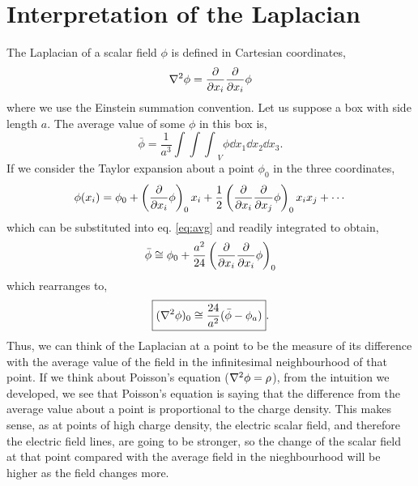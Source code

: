 \documentclass{book}
\begin{document}
\chapter{Interpretation of the Laplacian}
The Laplacian of a scalar field $\phi$ is defined in Cartesian coordinates,
\begin{equation}
	\laplacian{\phi} = \pdv{x_i}\pdv{x_i} \phi
\end{equation}
where we use the Einstein summation convention. Let us suppose a box with side length $a$. The average value of some $\phi$ in this box is,
\begin{equation}
	\bar{\phi} = \frac{1}{a^3}{\int\int\int}_V \phi \dd{x_1}\dd{x_2}\dd{x_3}. \label{eq:avg}
\end{equation}
If we consider the Taylor expansion about a point $\phi_0$ in the three coordinates, 
\begin{equation}
	\phi(x_i) = \phi_0 + \left(\pdv{x_i}\phi\right)_0x_i + \frac{1}{2}\left(\pdv{x_i}\pdv{x_j}\phi\right)_0x_ix_j + \cdots
\end{equation}
which can be substituted into eq. \eqref{eq:avg} and readily integrated to obtain,
\begin{equation}
	\bar{\phi} \cong \phi_0 + \frac{a^2}{24}\left(\pdv{x_i}\pdv{x_i}\phi\right)_0
\end{equation}
which rearranges to,
\begin{equation}
	\boxed{(\laplacian{\phi})_0 \cong \frac{24}{a^2}(\bar{\phi} - \phi_a)}.
\end{equation}
Thus, we can think of the Laplacian at a point to be the measure of its difference with the average value of the field in the infinitesimal neighbourhood of that point. If we think about Poisson's equation ($\laplacian{\phi} = \rho$), from the intuition we developed, we see that Poisson's equation is saying that the difference from the average value about a point is proportional to the charge density. This makes sense, as at points of high charge density, the electric scalar field, and therefore the electric field lines, are going to be stronger, so the change of the scalar field at that point compared with the average field in the nieghbourhood will be higher as the field changes more.
\end{document}

